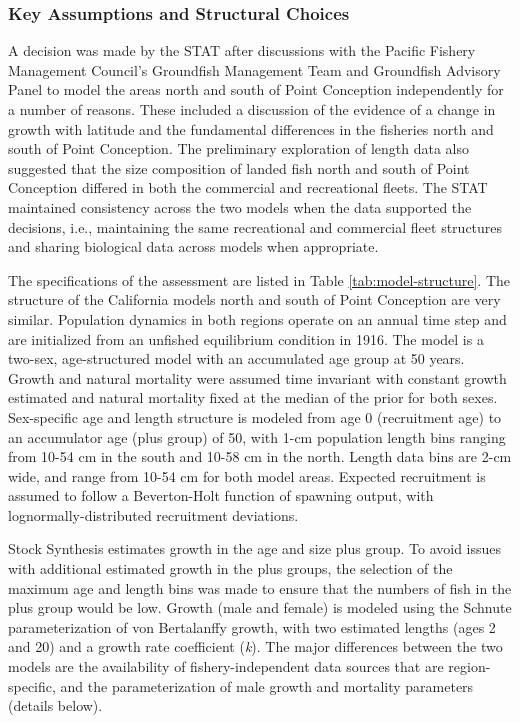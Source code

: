 \documentclass[11pt,
  english,
  letterpaper,
]{article}
\begin{document}
\hypertarget{key-assumptions-and-structural-choices}{%
\subsubsection{Key Assumptions and Structural Choices}\label{key-assumptions-and-structural-choices}}

A decision was made by the STAT after discussions with the Pacific Fishery Management Council's Groundfish Management Team and Groundfish Advisory Panel to model the areas north and south of Point Conception independently for a number of reasons. These included a discussion of the evidence of a change in growth with latitude and the fundamental differences in the fisheries north and south of Point Conception. The preliminary exploration of length data also suggested that the size composition of landed fish north and south of Point Conception differed in both the commercial and recreational fleets. The STAT maintained consistency across the two models when the data supported the decisions, i.e., maintaining the same recreational and commercial fleet structures and sharing biological data across models when appropriate.

The specifications of the assessment are listed in Table \ref{tab:model-structure}. The structure of the California models north and south of Point Conception are very similar. Population dynamics in both regions operate on an annual time step and are initialized from an unfished equilibrium condition in 1916. The model is a two-sex, age-structured model with an accumulated age group at 50 years. Growth and natural mortality were assumed time invariant with constant growth estimated and natural mortality fixed at the median of the prior for both sexes. Sex-specific age and length structure is modeled from age 0 (recruitment age) to an accumulator age (plus group) of 50, with 1-cm population length bins ranging from 10-54 cm in the south and 10-58 cm in the north. Length data bins are 2-cm wide, and range from 10-54 cm for both model areas. Expected recruitment is assumed to follow a Beverton-Holt function of spawning output, with lognormally-distributed recruitment deviations.

Stock Synthesis estimates growth in the age and size plus group. To avoid issues with additional estimated growth in the plus groups, the selection of the maximum age and length bins was made to ensure that the numbers of fish in the plus group would be low. Growth (male and female) is modeled using the Schnute parameterization of von Bertalanffy growth, with two estimated lengths (ages 2 and 20) and a growth rate coefficient (\emph{k}). The major differences between the two models are the availability of fishery-independent data sources that are region-specific, and the parameterization of male growth and mortality parameters (details below).
\end{document}
